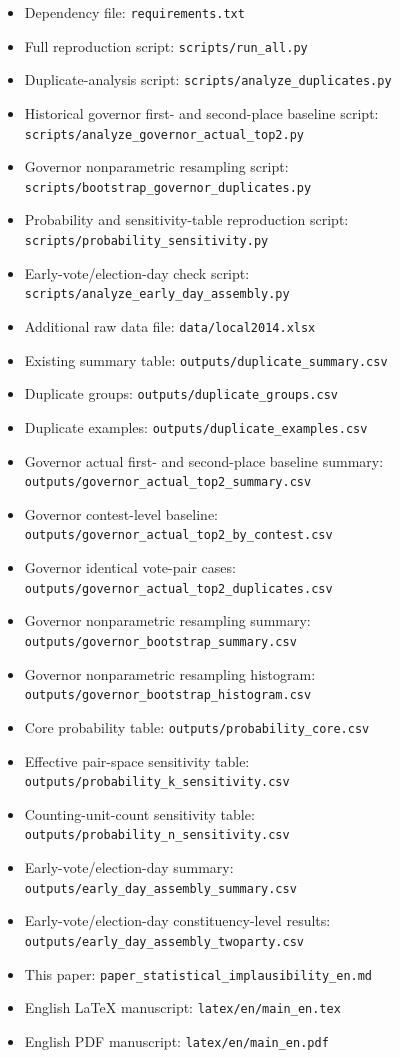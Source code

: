 \documentclass[preprint]{../ieie/IEIE}
\begin{document}
\begin{itemize}
\item Dependency file: \texttt{requirements.txt}
\item Full reproduction script: \texttt{scripts/run\_all.py}
\item Duplicate-analysis script: \texttt{scripts/analyze\_duplicates.py}
\item Historical governor first- and second-place baseline script: \texttt{scripts/analyze\_governor\_actual\_top2.py}
\item Governor nonparametric resampling script: \texttt{scripts/bootstrap\_governor\_duplicates.py}
\item Probability and sensitivity-table reproduction script: \texttt{scripts/probability\_sensitivity.py}
\item Early-vote/election-day check script: \texttt{scripts/analyze\_early\_day\_assembly.py}
\item Additional raw data file: \texttt{data/local2014.xlsx}
\item Existing summary table: \texttt{outputs/duplicate\_summary.csv}
\item Duplicate groups: \texttt{outputs/duplicate\_groups.csv}
\item Duplicate examples: \texttt{outputs/duplicate\_examples.csv}
\item Governor actual first- and second-place baseline summary: \texttt{outputs/governor\_actual\_top2\_summary.csv}
\item Governor contest-level baseline: \texttt{outputs/governor\_actual\_top2\_by\_contest.csv}
\item Governor identical vote-pair cases: \texttt{outputs/governor\_actual\_top2\_duplicates.csv}
\item Governor nonparametric resampling summary: \texttt{outputs/governor\_bootstrap\_summary.csv}
\item Governor nonparametric resampling histogram: \texttt{outputs/governor\_bootstrap\_histogram.csv}
\item Core probability table: \texttt{outputs/probability\_core.csv}
\item Effective pair-space sensitivity table: \texttt{outputs/probability\_k\_sensitivity.csv}
\item Counting-unit-count sensitivity table: \texttt{outputs/probability\_n\_sensitivity.csv}
\item Early-vote/election-day summary: \texttt{outputs/early\_day\_assembly\_summary.csv}
\item Early-vote/election-day constituency-level results: \texttt{outputs/early\_day\_assembly\_twoparty.csv}
\item This paper: \texttt{paper\_statistical\_implausibility\_en.md}
\item English LaTeX manuscript: \texttt{latex/en/main\_en.tex}
\item English PDF manuscript: \texttt{latex/en/main\_en.pdf}
\end{itemize}
\end{document}
